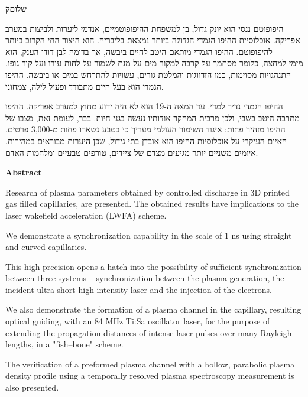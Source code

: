\documentclass[main.tex]{subfiles}
\begin{document}
\begin{center}
\LARGE{\textbf{שלוםק}}
\end{center}
\vspace{15px}
היפופוטם ננסי הוא יונק גדול, בן למשפחת ההיפופוטמיים, אנדמי ליערות ולביצות במערב אפריקה. אוכלוסיית ההיפו הגמדי הגדולה ביותר נמצאת בליבריה. הוא היצור החי הקרוב ביותר להיפופוטם. ההיפו הגמדי מותאם היטב לחיים ביבשה, אך בדומה לבן דודו הענק, הוא מימי-למחצה, כלומר מסתמך על קרבה למקור מים על מנת לשמור על לחות עורו ועל קור גופו. התנהגויות מסוימות, כמו הזדווגות והמלטת גורים, עשויות להתרחש במים או ביבשה. ההיפו הגמדי הוא בעל חיים מתבודד ופעיל לילה, צמחוני.

ההיפו הגמדי נדיר למדי. עד המאה ה-19 הוא לא היה ידוע מחוץ למערב אפריקה. ההיפו מתרבה היטב בשבי, ולכן מרבית המחקר אודותיו נעשה בגני חיות. בבר, לעומת זאת, מצבו של ההיפו מזהיר פחות: איגוד השימור העולמי מעריך כי בטבע נשארו פחות מ-3,000 פרטים. האיום העיקרי על אוכלוסיות ההיפו הוא אובדן בתי גידול, שכן היערות מבוראים במהירות. איומים משניים יותר מגיעים מצדם של ציידים, טורפים טבעיים ומלחמות האדם. 
\begin{center}
\LARGE{\textbf{Abstract}}
\end{center}
\large{
Research of plasma parameters obtained by controlled discharge in 3D printed gas filled capillaries, are presented. The obtained results have implications to the laser wakefield acceleration (LWFA) scheme.

We demonstrate a synchronization capability in the scale of 1 ns using straight and curved capillaries. 

This high precision opens a hatch into the possibility of sufficient synchronization between three systems -- synchronization between the plasma generation, the incident ultra-short high intensity laser and the injection of the electrons.

We also demonstrate the formation of a plasma channel in the  capillary, resulting optical guiding, with an 84 MHz Ti:Sa oscillator laser, for the purpose of extending the propagation distances of intense laser pulses over many Rayleigh lengths, in a "fish--bone" scheme.

The verification of a preformed plasma channel with a hollow, parabolic plasma density profile using a temporally resolved plasma spectroscopy measurement is also presented.
}
\end{document}
